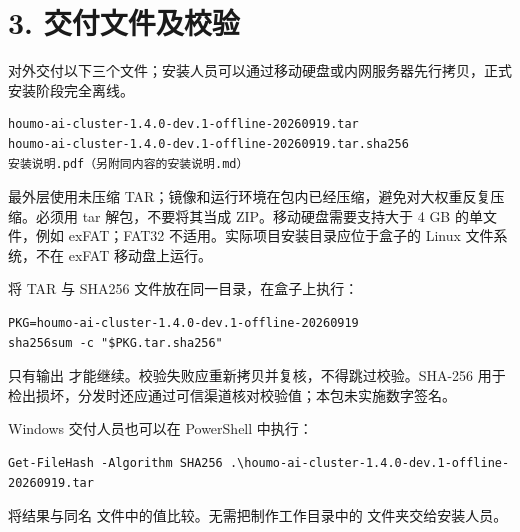 \documentclass[UTF8,a4paper,zihao=-4,fontset=windows]{ctexart}
\begin{document}
\section*{3. 交付文件及校验}
对外交付以下三个文件；安装人员可以通过移动硬盘或内网服务器先行拷贝，正式安装阶段完全离线。\par
\par\noindent\begin{minipage}{\linewidth}\begin{lstlisting}
houmo-ai-cluster-1.4.0-dev.1-offline-20260919.tar
houmo-ai-cluster-1.4.0-dev.1-offline-20260919.tar.sha256
安装说明.pdf（另附同内容的安装说明.md）
\end{lstlisting}\end{minipage}\par
最外层使用未压缩 TAR；镜像和运行环境在包内已经压缩，避免对大权重反复压缩。必须用 tar 解包，不要将其当成 ZIP。移动硬盘需要支持大于 4 GB 的单文件，例如 exFAT；FAT32 不适用。实际项目安装目录应位于盒子的 Linux 文件系统，不在 exFAT 移动盘上运行。\par
将 TAR 与 SHA256 文件放在同一目录，在盒子上执行：\par
\par\noindent\begin{minipage}{\linewidth}\begin{lstlisting}
PKG=houmo-ai-cluster-1.4.0-dev.1-offline-20260919
sha256sum -c "$PKG.tar.sha256"
\end{lstlisting}\end{minipage}\par
只有输出  才能继续。校验失败应重新拷贝并复核，不得跳过校验。SHA-256 用于检出损坏，分发时还应通过可信渠道核对校验值；本包未实施数字签名。\par
Windows 交付人员也可以在 PowerShell 中执行：\par
\par\noindent\begin{minipage}{\linewidth}\begin{lstlisting}
Get-FileHash -Algorithm SHA256 .\houmo-ai-cluster-1.4.0-dev.1-offline-20260919.tar
\end{lstlisting}\end{minipage}\par
将结果与同名  文件中的值比较。无需把制作工作目录中的  文件夹交给安装人员。\par
\end{document}
